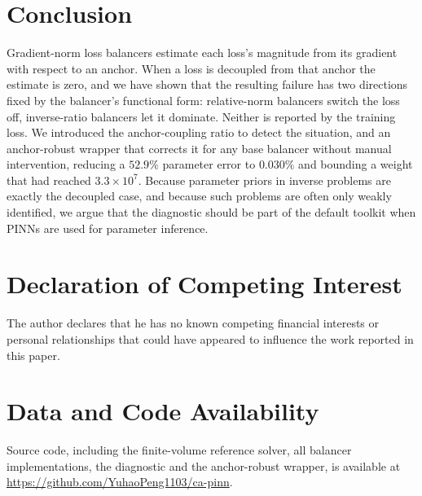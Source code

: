 \documentclass[a4paper,fleqn]{cas-sc}
\begin{document}
\section{Conclusion}

Gradient-norm loss balancers estimate each loss's magnitude from its gradient
with respect to an anchor. When a loss is decoupled from that anchor the
estimate is zero, and we have shown that the resulting failure has two
directions fixed by the balancer's functional form: relative-norm balancers
switch the loss off, inverse-ratio balancers let it dominate. Neither is
reported by the training loss. We introduced the anchor-coupling ratio to
detect the situation, and an anchor-robust wrapper that corrects it for any
base balancer without manual intervention, reducing a $52.9\%$ parameter error
to $0.030\%$ and bounding a weight that had reached $3.3\times10^7$. Because
parameter priors in inverse problems are exactly the decoupled case, and
because such problems are often only weakly identified, we argue that the
diagnostic should be part of the default toolkit when PINNs are used for
parameter inference.

\section*{Declaration of Competing Interest}

The author declares that he has no known competing financial interests or
personal relationships that could have appeared to influence the work reported
in this paper.

\section*{Data and Code Availability}

Source code, including the finite-volume reference solver, all balancer
implementations, the diagnostic and the anchor-robust wrapper, is available at
\url{https://github.com/YuhaoPeng1103/ca-pinn}.

\end{document}
